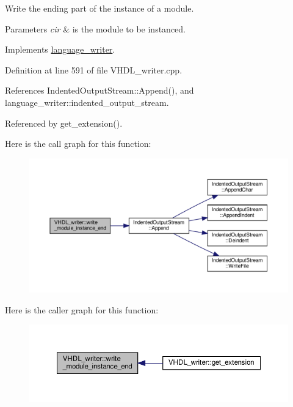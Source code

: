 Write the ending part of the instance of a module. 


\begin{DoxyParams}{Parameters}
{\em cir} & is the module to be instanced. \\
\hline
\end{DoxyParams}


Implements \hyperlink{classlanguage__writer_a58bc0c17545d1fc96385a5fbffbe62b2}{language\+\_\+writer}.



Definition at line 591 of file V\+H\+D\+L\+\_\+writer.\+cpp.



References Indented\+Output\+Stream\+::\+Append(), and language\+\_\+writer\+::indented\+\_\+output\+\_\+stream.



Referenced by get\+\_\+extension().

Here is the call graph for this function\+:
\nopagebreak
\begin{figure}[H]
\begin{center}
\leavevmode
\includegraphics[width=350pt]{d0/d0c/structVHDL__writer_a8aac905135d17dd707703da3b73dd6d5_cgraph}
\end{center}
\end{figure}
Here is the caller graph for this function\+:
\nopagebreak
\begin{figure}[H]
\begin{center}
\leavevmode
\includegraphics[width=350pt]{d0/d0c/structVHDL__writer_a8aac905135d17dd707703da3b73dd6d5_icgraph}
\end{center}
\end{figure}
\mbox{\label{structVHDL__writer_a30331328811ba735b896a60304e09074}} 
